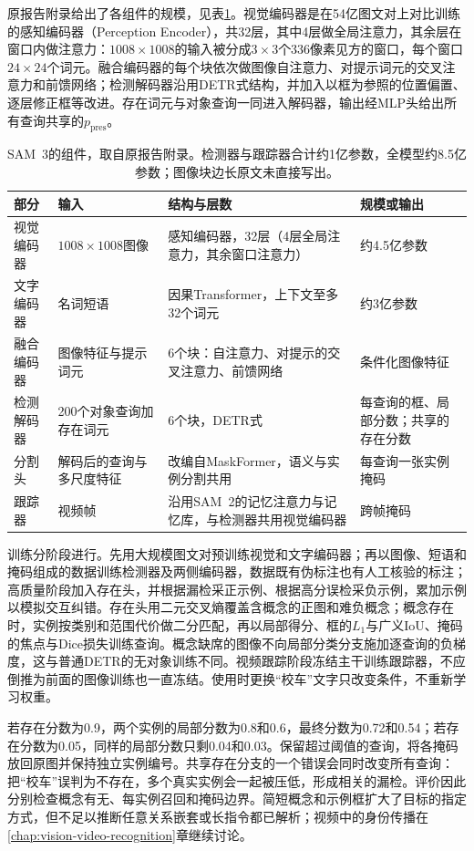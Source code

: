 原报告附录给出了各组件的规模，见表\ref{tab:vision-recognition-sam3-structure}。视觉编码器是在54亿图文对上对比训练的感知编码器（Perception Encoder），共32层，其中4层做全局注意力，其余层在窗口内做注意力：$1008\times1008$的输入被分成$3\times3$个336像素见方的窗口，每个窗口$24\times24$个词元。融合编码器的每个块依次做图像自注意力、对提示词元的交叉注意力和前馈网络；检测解码器沿用DETR式结构，并加入以框为参照的位置偏置、逐层修正框等改进。存在词元与对象查询一同进入解码器，输出经MLP头给出所有查询共享的$p_{\mathrm{pres}}$。

\begin{table}[tbp]
 \centering
 \small
 \begin{tabularx}{\linewidth}{@{}llXl@{}}
 \toprule
 部分 & 输入 & 结构与层数 & 规模或输出\\
 \midrule
 视觉编码器 & $1008\times1008$图像 & 感知编码器，32层（4层全局注意力，其余窗口注意力） & 约4.5亿参数\\
 文字编码器 & 名词短语 & 因果Transformer，上下文至多32个词元 & 约3亿参数\\
 融合编码器 & 图像特征与提示词元 & 6个块：自注意力、对提示的交叉注意力、前馈网络 & 条件化图像特征\\
 检测解码器 & 200个对象查询加存在词元 & 6个块，DETR式 & 每查询的框、局部分数；共享的存在分数\\
 分割头 & 解码后的查询与多尺度特征 & 改编自MaskFormer，语义与实例分割共用 & 每查询一张实例掩码\\
 跟踪器 & 视频帧 & 沿用SAM~2的记忆注意力与记忆库，与检测器共用视觉编码器 & 跨帧掩码\\
 \bottomrule
 \end{tabularx}
 \caption{SAM~3的组件，取自原报告附录。检测器与跟踪器合计约1亿参数，全模型约8.5亿参数；图像块边长原文未直接写出。}
 \label{tab:vision-recognition-sam3-structure}
\end{table}

训练分阶段进行。先用大规模图文对预训练视觉和文字编码器；再以图像、短语和掩码组成的数据训练检测器及两侧编码器，数据既有伪标注也有人工核验的标注；高质量阶段加入存在头，并根据漏检采正示例、根据高分误检采负示例，累加示例以模拟交互纠错。存在头用二元交叉熵覆盖含概念的正图和难负概念；概念存在时，实例按类别和范围代价做二分匹配，再以局部得分、框的$L_1$与广义IoU、掩码的焦点与Dice损失训练查询。概念缺席的图像不向局部分类分支施加逐查询的负梯度，这与普通DETR的无对象训练不同。视频跟踪阶段冻结主干训练跟踪器，不应倒推为前面的图像训练也一直冻结。使用时更换“校车”文字只改变条件，不重新学习权重。

若存在分数为0.9，两个实例的局部分数为0.8和0.6，最终分数为0.72和0.54；若存在分数为0.05，同样的局部分数只剩0.04和0.03。保留超过阈值的查询，将各掩码放回原图并保持独立实例编号。共享存在分支的一个错误会同时改变所有查询：把“校车”误判为不存在，多个真实实例会一起被压低，形成相关的漏检。评价因此分别检查概念有无、每实例召回和掩码边界。简短概念和示例框扩大了目标的指定方式，但不足以推断任意关系嵌套或长指令都已解析；视频中的身份传播在\ref{chap:vision-video-recognition}章继续讨论。

